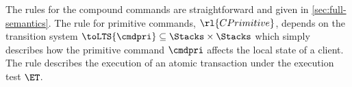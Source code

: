 The rules for the compound commands are straightforward and given in \cref{sec:full-semantics}.
The rule for primitive commands, $\rl{CPrimitive}$, 
depends on the 
transition system $\toLTS{\cmdpri} \subseteq \Stacks \times \Stacks$ 
which simply describes how the primitive command $\cmdpri$ affects the local state of a client.
The rule   describes the execution of an atomic 
transaction under the execution test $\ET$. 


